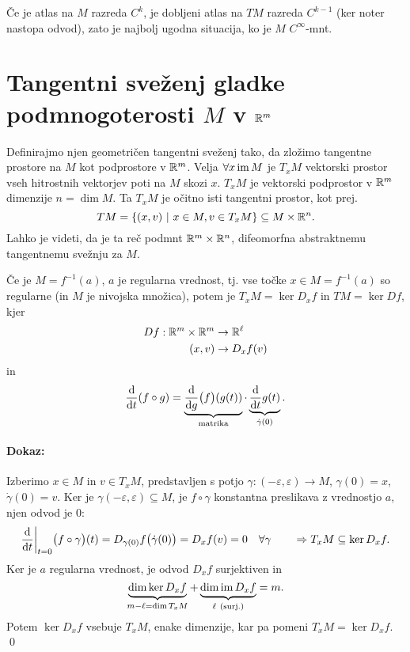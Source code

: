 \v Ce je atlas na $M$ razreda $C^k$, je dobljeni atlas na $TM$ razreda $C^{k -1}$ (ker noter nastopa odvod), zato je najbolj ugodna situacija, ko
je $M$ $C^\infty$-mnt.

\section{Tangentni sve\v zenj gladke podmnogoterosti $M$ v $\mathbb{R}^m$}

Definirajmo njen geometri\v cen tangentni sve\v zenj tako, da zlo\v zimo tangentne prostore na $M$ kot podprostore v $\mathbb{R}^m$. Velja
$\forall x \operatorname{im} M$ je $T_xM$ vektorski prostor vseh hitrostnih vektorjev poti na $M$ skozi $x$. $T_xM$ je vektorski podprostor v $\mathbb{R}^m$ dimenzije
$n = \dim M$. Ta $T_xM$ je o\v citno isti tangentni prostor, kot prej.
\[
	TM = \{(x,v)\ |\ x \in M, v \in T_xM\} \subseteq M \times \mathbb{R}^n.
\]
Lahko je videti, da je ta re\v c podmnt $\mathbb{R}^m \times \mathbb{R}^n$, difeomorfna abstraktnemu tangentnemu sve\v znju za $M$.

\begin{lema}
	\v Ce je $M = f^{-1}(a)$, $a$ je regularna vrednost, tj. vse to\v cke $x \in M = f^{-1}(a)$ so regularne (in $M$ je nivojska mno\v zica),
	potem je $T_xM = \ker D_xf$ in $TM = \ker Df$, kjer
	\begin{align*}
		Df : \mathbb{R}^m \times \mathbb{R}^m &\to \mathbb{R}^\ell \\
		(x,v) &\to D_x f(v)
	\end{align*}
	in
	\[
		\frac{\text{d}}{\text{d} t} (f \circ g) = \underbrace{\frac{\text{d}}{\text{d} g} \big(f\big) (g(t))}_\text{matrika} \cdot \underbrace{\frac{\text{d}}{\text{d} t}
			g(t)}_{\dot{\gamma}(0)}.
	\]
\end{lema}

\paragraph{Dokaz:}
Izberimo $x \in M$ in $v \in T_xM$, predstavljen s potjo $\gamma : (-\varepsilon, \varepsilon) \to M$, $\gamma(0) = x$, $\dot{\gamma}(0) = v$.
Ker je $\gamma (-\varepsilon, \varepsilon) \subseteq M$, je $f \circ \gamma$ konstantna preslikava z vrednostjo $a$, njen odvod je 0:
\[
	\frac{\text{d}}{\text{d} t}\bigg|_{t = 0} \big(f \circ \gamma\big)(t) = D_{\gamma(0)} f\big(\dot{\gamma}(0)\big) = D_x f(v) = 0\quad
		\forall \gamma \qquad \Rightarrow T_xM \subseteq \ker D_xf.
\]
Ker je $a$ regularna vrednost, je odvod $D_xf$ surjektiven in
\[
	\underbrace{\dim \ker D_xf}_{m - \ell = \dim T_xM} + \underbrace{\dim \im D_xf}_{\ell\ \text{(surj.)}} = m.
\]
Potem $\ker D_xf$ vsebuje $T_xM$, enake dimenzije, kar pa pomeni $T_xM = \ker D_xf$.
\qed


